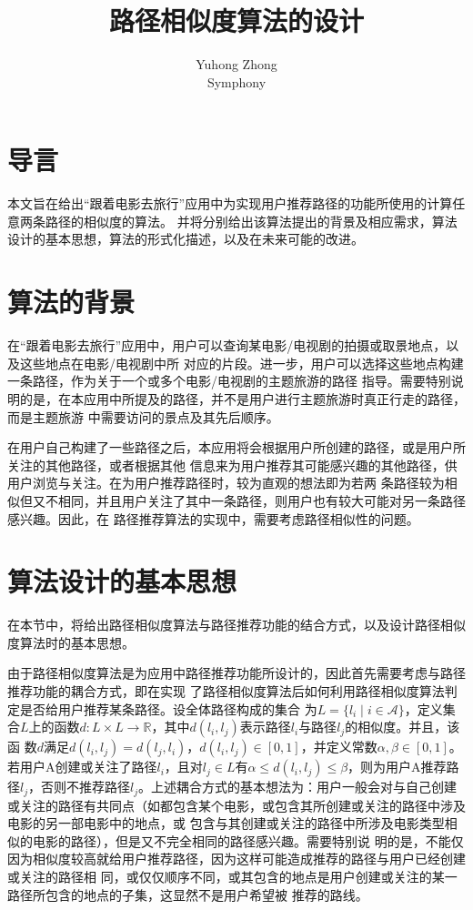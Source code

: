 
\title{\textbf{路径相似度算法的设计}}
\author{Yuhong Zhong\\[-0.5em]\scriptsize Symphony}
\date{}

\maketitle
\section{导言}
本文旨在给出“跟着电影去旅行”应用中为实现用户推荐路径的功能所使用的计算任意两条路径的相似度的算法。
并将分别给出该算法提出的背景及相应需求，算法设计的基本思想，算法的形式化描述，以及在未来可能的改进。

\section{算法的背景}
在“跟着电影去旅行”应用中，用户可以查询某电影/电视剧的拍摄或取景地点，以及这些地点在电影/电视剧中所
对应的片段。进一步，用户可以选择这些地点构建一条路径，作为关于一个或多个电影/电视剧的主题旅游的路径
指导。需要特别说明的是，在本应用中所提及的路径，并不是用户进行主题旅游时真正行走的路径，而是主题旅游
中需要访问的景点及其先后顺序。

在用户自己构建了一些路径之后，本应用将会根据用户所创建的路径，或是用户所关注的其他路径，或者根据其他
信息来为用户推荐其可能感兴趣的其他路径，供用户浏览与关注。在为用户推荐路径时，较为直观的想法即为若两
条路径较为相似但又不相同，并且用户关注了其中一条路径，则用户也有较大可能对另一条路径感兴趣。因此，在
路径推荐算法的实现中，需要考虑路径相似性的问题。

\section{算法设计的基本思想}
在本节中，将给出路径相似度算法与路径推荐功能的结合方式，以及设计路径相似度算法时的基本思想。

由于路径相似度算法是为应用中路径推荐功能所设计的，因此首先需要考虑与路径推荐功能的耦合方式，即在实现
了路径相似度算法后如何利用路径相似度算法判定是否给用户推荐某条路径。设全体路径构成的集合
为$L=\{l_i\mid i\in
\mathscr{A}\}$，定义集合$L$上的函数$d:L\times L\rightarrow
\mathbb{R}$，其中$d(l_i,l_j)$表示路径$l_i$与路径$l_j$的相似度。并且，该函
数$d$满足$d(l_i,l_j)=d(l_j,l_i)$，$d(l_i,l_j)\in
[0,1]$，并定义常数$\alpha,\beta\in [0,1]$。若用户A创建或关注了路径$l_i$，且对$l_j\in
L$有$\alpha \le d(l_i,l_j) \le
\beta$，则为用户A推荐路径$l_j$，否则不推荐路径$l_j$。上述耦合方式的基本想法为：用户一般会对与自己创建
或关注的路径有共同点（如都包含某个电影，或包含其所创建或关注的路径中涉及电影的另一部电影中的地点，或
包含与其创建或关注的路径中所涉及电影类型相似的电影的路径），但是又不完全相同的路径感兴趣。需要特别说
明的是，不能仅因为相似度较高就给用户推荐路径，因为这样可能造成推荐的路径与用户已经创建或关注的路径相
同，或仅仅顺序不同，或其包含的地点是用户创建或关注的某一路径所包含的地点的子集，这显然不是用户希望被
推荐的路线。


